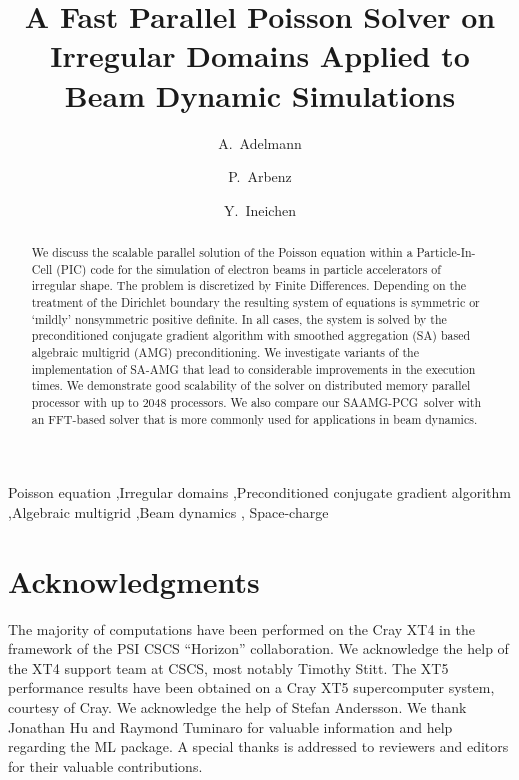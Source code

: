 \documentclass[a4paper,10pt,3p,preprint,pdftex]{elsarticle}
\title{A Fast Parallel Poisson Solver on Irregular Domains Applied to Beam
  Dynamic Simulations }
\author[psi]{A.~Adelmann\corref{cor}}
\author[eth]{P.~Arbenz}
\author[psi,eth]{Y.~Ineichen}
\newcommand{\oursolver}{\textsc{SAAMG-PCG}}
\begin{document}
\begin{keyword}
  Poisson equation \sep Irregular domains \sep Preconditioned conjugate
  gradient algorithm \sep Algebraic multigrid \sep Beam dynamics \sep
  Space-charge
\end{keyword}

\begin{abstract}
  We discuss the scalable parallel solution of the Poisson equation
  within a Particle-In-Cell (PIC) code for the simulation of electron
  beams in particle accelerators of irregular shape.  The problem is
  discretized by Finite Differences.  Depending on the treatment of the
  Dirichlet boundary the resulting system of equations is symmetric or
  `mildly' nonsymmetric positive definite.  In all cases, the system is
  solved by the preconditioned conjugate gradient algorithm with
  smoothed aggregation (SA) based algebraic multigrid (AMG)
  preconditioning.  We investigate variants of the implementation of
  SA-AMG that lead to considerable improvements in the execution times.
  We demonstrate good scalability of the solver on distributed memory
  parallel processor with up to 2048 processors.  We also compare our
  \oursolver\ solver with an FFT-based solver that is more commonly used
  for applications in beam dynamics.
\end{abstract}

\maketitle

\nocite{*}








\section*{Acknowledgments}

The majority of computations have been performed on the Cray XT4 in the
framework of the PSI CSCS ``Horizon'' collaboration.  We acknowledge the
help of the XT4 support team at CSCS, most notably Timothy Stitt.
The XT5 performance results have been obtained on a Cray XT5
supercomputer system, courtesy of Cray.  We acknowledge the help of
Stefan Andersson.
We thank Jonathan Hu and Raymond Tuminaro for valuable information and
help regarding the ML package.
A special thanks is addressed to reviewers and editors for their valuable
contributions.



\end{document}

